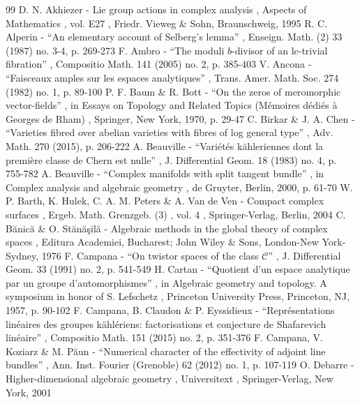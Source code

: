\documentclass[11pt]{article}
\theoremstyle{plain}
\theoremstyle{definition}
\numberwithin{equation}{thm}
\numberwithin{enumi}{thm}
\begin{document}

\begin{thebibliography}{99}
 D. N. Akhiezer - Lie group actions in complex analysis , Aspects of Mathematics , vol. E27 , Friedr. Vieweg \& Sohn, Braunschweig, 1995
 R. C. Alperin - “An elementary account of Selberg’s lemma” , Enseign. Math. (2) 33 (1987) no. 3-4, p. 269-273
 F. Ambro - “The moduli $b$-divisor of an lc-trivial fibration” , Compositio Math. 141 (2005) no. 2, p. 385-403
 V. Ancona - “Faisceaux amples sur les espaces analytiques” , Trans. Amer. Math. Soc. 274 (1982) no. 1, p. 89-100
 P. F. Baum \& R. Bott - “On the zeros of meromorphic vector-fields” , in Essays on Topology and Related Topics (Mémoires dédiés à Georges de Rham) , Springer, New York, 1970, p. 29-47
 C. Birkar \& J. A. Chen - “Varieties fibred over abelian varieties with fibres of log general type” , Adv. Math. 270 (2015), p. 206-222
 A. Beauville - “Variétés kähleriennes dont la première classe de Chern est nulle” , J. Differential Geom. 18 (1983) no. 4, p. 755-782
 A. Beauville - “Complex manifolds with split tangent bundle” , in Complex analysis and algebraic geometry , de Gruyter, Berlin, 2000, p. 61-70
 W. P. Barth, K. Hulek, C. A. M. Peters \& A. Van de Ven - Compact complex surfaces , Ergeb. Math. Grenzgeb. (3) , vol. 4 , Springer-Verlag, Berlin, 2004
 C. Bănică \& O. Stănăşilă - Algebraic methods in the global theory of complex spaces , Editura Academiei, Bucharest; John Wiley \& Sons, London-New York-Sydney, 1976
 F. Campana - “On twistor spaces of the class $\mathscr{C}$” , J. Differential Geom. 33 (1991) no. 2, p. 541-549
 H. Cartan - “Quotient d’un espace analytique par un groupe d’automorphismes” , in Algebraic geometry and topology. A symposium in honor of S. Lefschetz , Princeton University Press, Princeton, NJ, 1957, p. 90-102
 F. Campana, B. Claudon \& P. Eyssidieux - “Représentations linéaires des groupes kählériens: factorisations et conjecture de Shafarevich linéaire” , Compositio Math. 151 (2015) no. 2, p. 351-376
 F. Campana, V. Koziarz \& M. Păun - “Numerical character of the effectivity of adjoint line bundles” , Ann. Inst. Fourier (Grenoble) 62 (2012) no. 1, p. 107-119
 O. Debarre - Higher-dimensional algebraic geometry , Universitext , Springer-Verlag, New York, 2001

\end{thebibliography}
\end{document}
